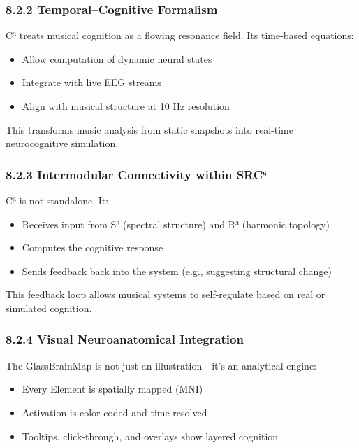 \subsubsection*{8.2.2 Temporal–Cognitive Formalism}

C³ treats musical cognition as a flowing resonance field. Its time-based equations:

\begin{itemize}
    \item Allow computation of dynamic neural states
    \item Integrate with live EEG streams
    \item Align with musical structure at 10 Hz resolution
\end{itemize}

This transforms music analysis from static snapshots into real-time neurocognitive simulation.

\subsubsection*{8.2.3 Intermodular Connectivity within SRC⁹}

C³ is not standalone. It:

\begin{itemize}
    \item Receives input from S³ (spectral structure) and R³ (harmonic topology)
    \item Computes the cognitive response
    \item Sends feedback back into the system (e.g., suggesting structural change)
\end{itemize}

This feedback loop allows musical systems to self-regulate based on real or simulated cognition.

\subsubsection*{8.2.4 Visual Neuroanatomical Integration}

The GlassBrainMap is not just an illustration—it’s an analytical engine:

\begin{itemize}
    \item Every Element is spatially mapped (MNI)
    \item Activation is color-coded and time-resolved
    \item Tooltips, click-through, and overlays show layered cognition
\end{itemize}

